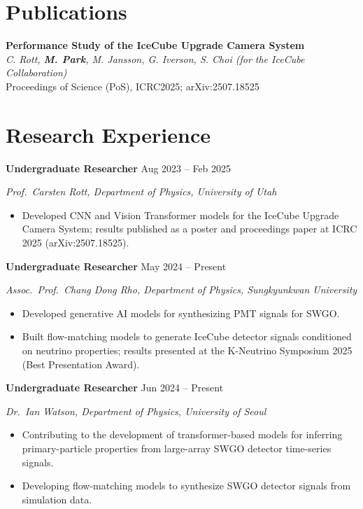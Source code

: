 \documentclass[11pt, a4paper]{article}
\newcommand{\experienceitem}[4]{
    \begin{tcolorbox}[
        colback=lightgray,
        colframe=primary,
        boxrule=0pt,
        leftrule=3pt,
        arc=0pt,
        left=5pt,
        right=5pt,
        top=5pt,
        bottom=5pt
    ]
    \textbf{\large #1} \hfill {\color{primary}#2}
    
    \textit{#3}
    
    #4
    \end{tcolorbox}
    \vspace{3pt}
}
\begin{document}
\section{Publications}

\newcommand{\publication}[3]{
    \vspace{4pt}
    \noindent
    \textbf{#1} \\
    \textit{#2} \\
    {\small #3}
    \vspace{6pt}
}

\publication{Performance Study of the IceCube Upgrade Camera System}
{C. Rott, \textbf{M. Park}, M. Jansson, G. Iverson, S. Choi (for the IceCube Collaboration)}
{Proceedings of Science (PoS), ICRC2025; arXiv:2507.18525}

\section{Research Experience}
\experienceitem{Undergraduate Researcher}{Aug 2023 -- Feb 2025}{Prof.\ Carsten Rott, Department of Physics, University of Utah}{
    \begin{itemize}[leftmargin=*, itemsep=2pt]
        \item Developed CNN and Vision Transformer models for the IceCube Upgrade Camera System; results published as a poster and proceedings paper at ICRC 2025 (arXiv:2507.18525).
    \end{itemize}
}
\experienceitem{Undergraduate Researcher}{May 2024 -- Present}{Assoc.\ Prof.\ Chang Dong Rho, Department of Physics, Sungkyunkwan University}{
    \begin{itemize}[leftmargin=*, itemsep=2pt]
        \item Developed generative AI models for synthesizing PMT signals for SWGO.
        \item Built flow-matching models to generate IceCube detector signals conditioned on neutrino properties; results presented at the K-Neutrino Symposium 2025 (Best Presentation Award).
    \end{itemize}
}
\experienceitem{Undergraduate Researcher}{Jun 2024 -- Present}{Dr.\ Ian Watson, Department of Physics, University of Seoul}{
    \begin{itemize}[leftmargin=*, itemsep=2pt]
        \item Contributing to the development of transformer-based models for inferring primary-particle properties from large-array SWGO detector time-series signals.
        \item Developing flow-matching models to synthesize SWGO detector signals from simulation data.
    \end{itemize}
}
\end{document}
